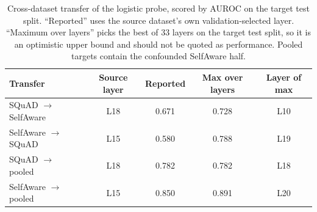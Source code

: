 \begin{table}[H]
\centering\small
\caption{Cross-dataset transfer of the logistic probe, scored by AUROC on the target test split. ``Reported'' uses the source dataset's own validation-selected layer. ``Maximum over layers'' picks the best of 33 layers on the target test split, so it is an optimistic upper bound and should not be quoted as performance. Pooled targets contain the confounded SelfAware half.}
\label{tab:transfer}
\begin{tabular}{@{}lcccc@{}}
\toprule
Transfer & Source layer & Reported & Max over layers & Layer of max \\
\midrule
SQuAD $\to$ SelfAware & L18 & 0.671 & 0.728 & L10 \\
SelfAware $\to$ SQuAD & L15 & 0.580 & 0.788 & L19 \\
SQuAD $\to$ pooled & L18 & 0.782 & 0.782 & L18 \\
SelfAware $\to$ pooled & L15 & 0.850 & 0.891 & L20 \\
\bottomrule
\end{tabular}
\end{table}
